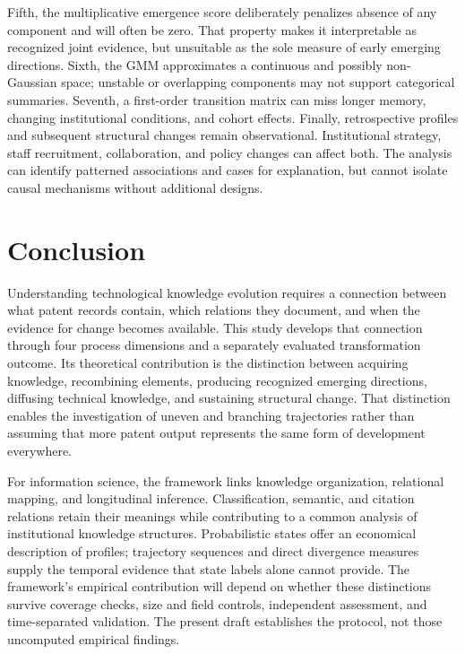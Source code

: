 Fifth, the multiplicative emergence score deliberately penalizes absence of any
component and will often be zero. That property makes it interpretable as
recognized joint evidence, but unsuitable as the sole measure of early emerging
directions. Sixth, the GMM approximates a continuous and possibly non-Gaussian
space; unstable or overlapping components may not support categorical summaries.
Seventh, a first-order transition matrix can miss longer memory, changing
institutional conditions, and cohort effects. Finally, retrospective profiles
and subsequent structural changes remain observational. Institutional strategy,
staff recruitment, collaboration, and policy changes can affect both. The analysis
can identify patterned associations and cases for explanation, but cannot isolate
causal mechanisms without additional designs.

\section{Conclusion}\label{sec:conclusion}
Understanding technological knowledge evolution requires a connection between
what patent records contain, which relations they document, and when the evidence
for change becomes available. This study develops that connection through four
process dimensions and a separately evaluated transformation outcome. Its
theoretical contribution is the distinction between acquiring knowledge,
recombining elements, producing recognized emerging directions, diffusing
technical knowledge, and sustaining structural change. That distinction enables
the investigation of uneven and branching trajectories rather than assuming
that more patent output represents the same form of development everywhere.

For information science, the framework links knowledge organization, relational
mapping, and longitudinal inference. Classification, semantic, and citation
relations retain their meanings while contributing to a common analysis of
institutional knowledge structures. Probabilistic states offer an economical
description of profiles; trajectory sequences and direct divergence measures
supply the temporal evidence that state labels alone cannot provide. The
framework's empirical contribution will depend on whether these distinctions
survive coverage checks, size and field controls, independent assessment, and
time-separated validation. The present draft establishes the protocol, not those
uncomputed empirical findings.

